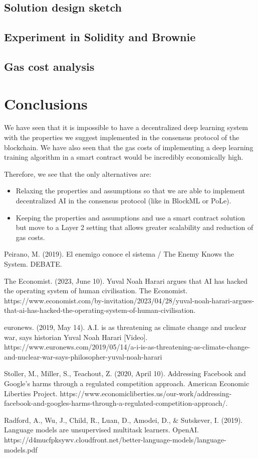 \documentclass[conference]{IEEEtran}
\begin{document}
\subsection{Solution design sketch}
\subsection{Experiment in Solidity and Brownie}
\subsection{Gas cost analysis}

\section{Conclusions}


We have seen that it is impossible to have a decentralized deep learning system with the properties we suggest implemented in the consensus protocol of the blockchain. We have also seen that the gas costs of implementing a deep learning training algorithm in a smart contract would be incredibly economically high.

Therefore, we see that the only alternatives are:
\begin{itemize}
\item Relaxing the properties and assumptions so that we are able to implement decentralized AI in the consensus protocol (like in BlockML or PoLe).
\item Keeping the properties and assumptions and use a smart contract solution but move to a Layer 2 setting that allows greater scalability and reduction of gas costs.
\end{itemize}

\begin{thebibliography}{00}

 Peirano, M. (2019). El enemigo conoce el sistema / The Enemy Knows the System. DEBATE.

 The Economist. (2023, June 10). Yuval Noah Harari argues that AI has hacked the operating system of human civilisation. The Economist. https://www.economist.com/by-invitation/2023/04/28/yuval-noah-harari-argues-that-ai-has-hacked-the-operating-system-of-human-civilisation.

 euronews. (2019, May 14). A.I. is as threatening as climate change and nuclear war, says historian Yuval Noah Harari [Video]. https://www.euronews.com/2019/05/14/a-i-is-as-threatening-as-climate-change-and-nuclear-war-says-philosopher-yuval-noah-harari

 Stoller, M., Miller, S., Teachout, Z. (2020, April 10). Addressing Facebook and Google’s harms through a regulated competition approach. American Economic Liberties Project. https://www.economicliberties.us/our-work/addressing-facebook-and-googles-harms-through-a-regulated-competition-approach/.

 Radford, A., Wu, J., Child, R., Luan, D., Amodei, D., \& Sutskever, I. (2019). Language models are unsupervised multitask learners. OpenAI. https://d4mucfpksywv.cloudfront.net/better-language-models/language-models.pdf

\end{thebibliography}
\end{document}
